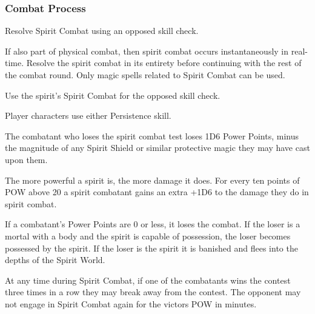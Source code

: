 \subsubsection{Combat Process}
\begin{rpg-list}
\item Resolve Spirit Combat using an opposed skill check.
\item If also part of physical combat, then spirit combat occurs instantaneously in real-time. Resolve the spirit combat in its entirety before continuing with the rest of the combat round. Only magic spells related to Spirit Combat can be used.
\item Use the spirit's Spirit Combat for the opposed skill check.
\item Player characters use either Persistence skill. %
\item The combatant who loses the spirit combat test loses 1D6 Power Points, minus the magnitude of any Spirit Shield or similar protective magic they may have cast upon them.
\item The more powerful a spirit is, the more damage it does. For every ten points of POW above 20 a spirit combatant gains an extra +1D6 to the damage they do in spirit combat.
\item If a combatant’s Power Points are 0 or less, it loses the combat. If the loser is a mortal with a body and the spirit is capable of possession, the loser becomes possessed by the spirit. If the loser is the spirit it is banished and flees into the depths of the Spirit World. 
\item At any time during Spirit Combat, if one of the combatants wins the contest three times in a row they may break away from the contest. The opponent may not engage in Spirit Combat again for the victors POW in minutes.
\end{rpg-list}



